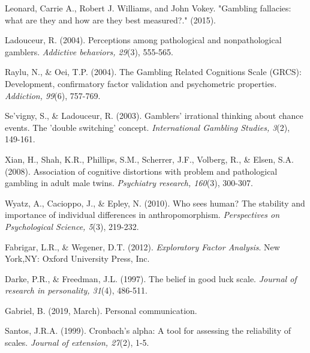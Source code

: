 \documentclass[twoside,twocolumn]{article}
\begin{document}
\begin{thebibliography}{99} %

  Leonard, Carrie A., Robert J. Williams, and John Vokey. "Gambling fallacies: what are they and how are they best measured?." (2015).

  Ladouceur, R. (2004). Perceptions among pathological and nonpathological gamblers. \emph{Addictive behaviors, 29}(3), 555-565.

  Raylu, N., \& Oei, T.P. (2004). The Gambling Related Cognitions Scale (GRCS): Development, confirmatory factor validation and psychometric properties. \emph{Addiction, 99}(6), 757-769.

  Se'vigny, S., \& Ladouceur, R. (2003). Gamblers' irrational thinking about chance events. The 'double switching' concept. \emph{International Gambling Studies, 3}(2), 149-161.

  Xian, H., Shah, K.R., Phillips, S.M., Scherrer, J.F., Volberg, R., \& Elsen, S.A. (2008). Association of cognitive distortions with problem and pathological gambling in adult male twins. \emph{Psychiatry research, 160}(3), 300-307.

  Wyatz, A., Cacioppo, J., \& Epley, N. (2010). Who sees human? The stability and importance of individual differences in anthropomorphism. \emph{Perspectives on Psychological Science, 5}(3), 219-232.

  Fabrigar, L.R., \& Wegener, D.T. (2012). \emph{Exploratory Factor Analysis}. New York,NY: Oxford University Press, Inc.

  Darke, P.R., \& Freedman, J.L. (1997). The belief in good luck scale. \emph{Journal of research in personality, 31}(4), 486-511.

  Gabriel, B. (2019, March). Personal communication.

  Santos, J.R.A. (1999). Cronbach's alpha: A tool for assessing the reliability of scales. \emph{Journal of extension, 27}(2), 1-5.


\end{thebibliography}
\end{document}
